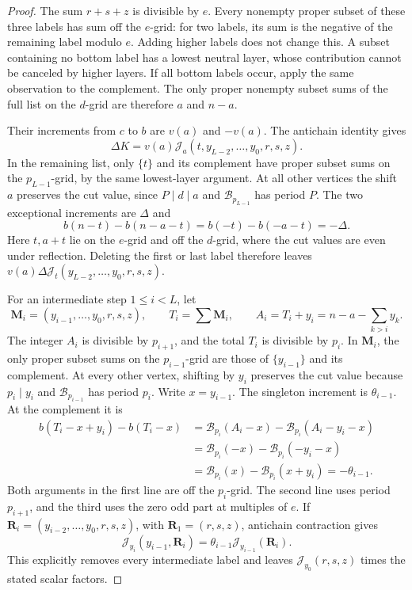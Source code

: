 \documentclass[11pt,a4paper]{amsart}
\numberwithin{equation}{section}
\theoremstyle{plain}
\theoremstyle{definition}
\newcommand{\Jcal}{\mathcal J}
\begin{document}
\begin{proof}
The sum \(r+s+z\) is divisible by \(e\).  Every nonempty proper subset
of these three labels has sum off the \(e\)-grid: for two labels, its
sum is the negative of the remaining label modulo \(e\).  Adding higher
labels does not change this.  A subset containing no bottom label has a
lowest neutral layer, whose contribution cannot be canceled by higher
layers.  If all bottom labels occur, apply the same observation to the
complement.  The only proper nonempty subset sums of the full list on the
\(d\)-grid are therefore \(a\) and \(n-a\).

Their increments from \(c\) to \(b\) are \(v(a)\) and \(-v(a)\).
The antichain identity gives
\[
\Delta K=v(a)\Jcal_a(t,y_{L-2},\ldots,y_0,r,s,z).
\]
In the remaining list, only \(\{t\}\) and its complement have proper
subset sums on the \(p_{L-1}\)-grid, by the same lowest-layer argument.
At all other vertices the shift \(a\) preserves the cut value, since
\(P\mid d\mid a\) and \(\mathcal B_{p_{L-1}}\) has period \(P\).
The two exceptional increments are \(\Delta\) and
\[
b(n-t)-b(n-a-t)=b(-t)-b(-a-t)=-\Delta.
\]
Here \(t,a+t\) lie on the \(e\)-grid and off the \(d\)-grid,
where the cut values are even under reflection.  Deleting the first or
last label therefore leaves
\(v(a)\Delta\Jcal_t(y_{L-2},\ldots,y_0,r,s,z)\).

For an intermediate step \(1\le i<L\), let
\[
\mathbf M_i=(y_{i-1},\ldots,y_0,r,s,z),\qquad
T_i=\sum\mathbf M_i,\qquad A_i=T_i+y_i=n-a-\sum_{k>i}y_k.
\]
The integer \(A_i\) is divisible by \(p_{i+1}\), and the total
\(T_i\) is divisible by \(p_i\).  In \(\mathbf M_i\), the only
proper subset sums on the \(p_{i-1}\)-grid are those of
\(\{y_{i-1}\}\) and its complement.  At every other vertex, shifting
by \(y_i\) preserves the cut value because \(p_i\mid y_i\) and
\(\mathcal B_{p_{i-1}}\) has period \(p_i\).  Write \(x=y_{i-1}\).
The singleton increment is \(\theta_{i-1}\).  At the complement it is
\begin{align*}
b(T_i-x+y_i)-b(T_i-x)
&=\mathcal B_{p_i}(A_i-x)-\mathcal B_{p_i}(A_i-y_i-x)\\
&=\mathcal B_{p_i}(-x)-\mathcal B_{p_i}(-y_i-x)\\
&=\mathcal B_{p_i}(x)-\mathcal B_{p_i}(x+y_i)=-\theta_{i-1}.
\end{align*}
Both arguments in the first line are off the \(p_i\)-grid.  The second
line uses period \(p_{i+1}\), and the third uses the zero odd part at
multiples of \(e\).  If \(\mathbf R_i=(y_{i-2},\ldots,y_0,r,s,z)\),
with \(\mathbf R_1=(r,s,z)\), antichain contraction gives
\[
\Jcal_{y_i}(y_{i-1},\mathbf R_i)
=\theta_{i-1}\Jcal_{y_{i-1}}(\mathbf R_i).
\]
This explicitly removes every intermediate label and leaves
\(\Jcal_{y_0}(r,s,z)\) times the stated scalar factors.


\end{proof}
\end{document}
